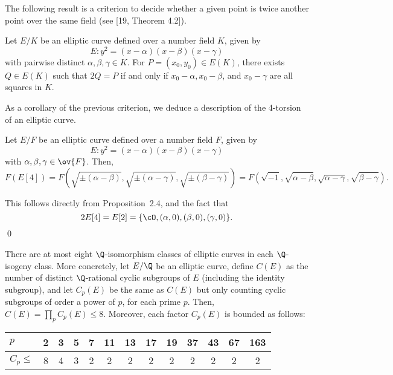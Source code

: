 The following result is a criterion to decide whether a given point is twice another point over the same field (see [19, Theorem 4.2]).


\begin{prop} %
Let $E/K$ be an elliptic curve defined over a number field $K$, given by
	\[
	E \colon y^2= (x - \alpha)(x - \beta)(x - \gamma)
	\]
with pairwise distinct $\alpha, \beta, \gamma \in K$. For $P= (x_0, y_0) \in E(K)$, there exists $Q \in E(K)$ such that $2Q= P$ if and only if $x_0 - \alpha, x_0 - \beta$, and $x_0 - \gamma$ are all squares in $K$. 
\end{prop}


As a corollary of the previous criterion, we deduce a description of the 4-torsion of an elliptic curve.


\begin{cor}
Let $E/F$ be an elliptic curve defined over a number field $F$, given by
	\[
	E \colon y^2=  (x - \alpha)(x - \beta)(x - \gamma)
	\]
with $\alpha, \beta, \gamma \in \ov{F}$. Then,
	\[
	F(E[4])= F \left( \sqrt{\pm (\alpha - \beta)}, \sqrt{\pm (\alpha - \gamma)}, \sqrt{\pm (\beta - \gamma)} \right)= F \left( \sqrt{-1}, \sqrt{\alpha - \beta}, \sqrt{\alpha - \gamma}, \sqrt{\beta - \gamma} \right). 
	\]
\end{cor}

\pf This follows directly from Proposition~2.4, and the fact that
	\[
	2E[4]= E[2]= \{ \cO, (\alpha,0), (\beta,0), (\gamma,0) \}.
	\]
\qed 


\begin{thm} %
There are at most eight $\Q$-isomorphism classes of elliptic curves in each $\Q$-isogeny class. More concretely, let $E/\Q$ be an elliptic curve, define $C(E)$ as the number of distinct $\Q$-rational cyclic subgroups of $E$ (including the identity subgroup), and let $C_p(E)$ be the same as $C(E)$ but only counting cyclic subgroups of order a power of $p$, for each prime $p$. Then, $C(E)= \prod_p C_p(E) \leq 8$. Moreover, each factor $C_p(E)$ is bounded as follows:
	\begin{table}[!ht]
	\centering
	\begin{tabular}{l|c|c|c|c|c|c|c|c|c|c|c|c}
	$p$ & 2 & 3 & 5 & 7 & 11 & 13 & 17 & 19 & 37 & 43 & 67 & 163 \\ \hline
	$C_p \leq$ & 8 & 4 & 3 & 2 & 2 & 2 & 2 & 2 & 2 & 2 & 2 & 2
	\end{tabular}
	\end{table}
\end{thm}



